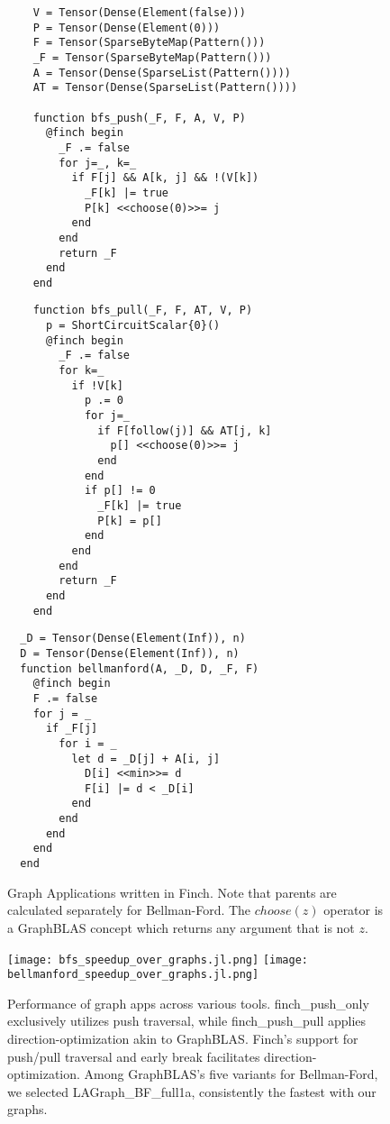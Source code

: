 \begin{figure}[b]
    \begin{minipage}{0.33\linewidth}
    \begin{verbatim}
    V = Tensor(Dense(Element(false)))
    P = Tensor(Dense(Element(0)))
    F = Tensor(SparseByteMap(Pattern()))
    _F = Tensor(SparseByteMap(Pattern()))
    A = Tensor(Dense(SparseList(Pattern())))
    AT = Tensor(Dense(SparseList(Pattern())))

    function bfs_push(_F, F, A, V, P)
      @finch begin
        _F .= false
        for j=_, k=_
          if F[j] && A[k, j] && !(V[k])
            _F[k] |= true
            P[k] <<choose(0)>>= j
          end
        end
        return _F
      end
    end

    \end{verbatim}
\end{minipage}%
\begin{minipage}{0.33\linewidth}
    \begin{verbatim}
    function bfs_pull(_F, F, AT, V, P)
      p = ShortCircuitScalar{0}()
      @finch begin
        _F .= false
        for k=_
          if !V[k]
            p .= 0
            for j=_
              if F[follow(j)] && AT[j, k]
                p[] <<choose(0)>>= j
              end
            end
            if p[] != 0
              _F[k] |= true
              P[k] = p[]
            end
          end
        end
        return _F
      end
    end
    \end{verbatim}
\end{minipage}%
\begin{minipage}{0.33\linewidth}
  \begin{verbatim}
  _D = Tensor(Dense(Element(Inf)), n)
  D = Tensor(Dense(Element(Inf)), n)
  function bellmanford(A, _D, D, _F, F)
    @finch begin
    F .= false
    for j = _
      if _F[j]
        for i = _
          let d = _D[j] + A[i, j]
            D[i] <<min>>= d
            F[i] |= d < _D[i]
          end
        end
      end
    end
  end
\end{verbatim}
\end{minipage}
\caption{Graph Applications written in Finch. Note that parents are calculated separately for Bellman-Ford. The $choose(z)$ operator is a GraphBLAS concept which returns any argument that is not $z$.}\label{fig:graph_listing}
\end{figure}

\begin{figure}[t]
	\texttt{[image: bfs\_speedup\_over\_graphs.jl.png]}%
	\texttt{[image: bellmanford\_speedup\_over\_graphs.jl.png]}
    \vspace{-12pt}
    \caption{Performance of graph apps across various tools. finch\_push\_only exclusively utilizes push traversal, while finch\_push\_pull applies direction-optimization akin to GraphBLAS. Finch's support for push/pull traversal and early break facilitates direction-optimization. Among GraphBLAS's five variants for Bellman-Ford, we selected LAGraph\_BF\_full1a, consistently the fastest with our graphs.}
     \label{fig:graph_result}
\end{figure}